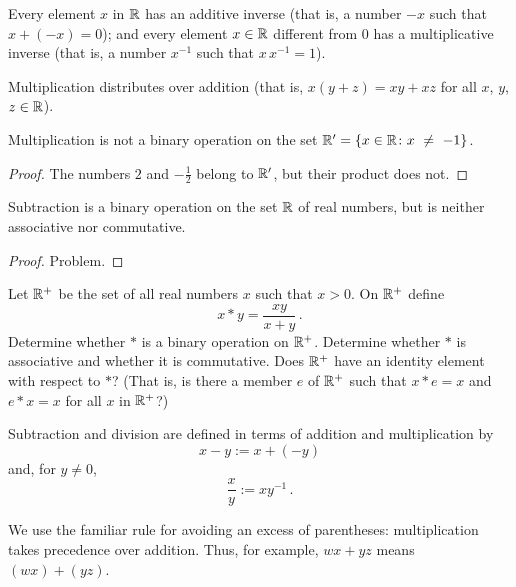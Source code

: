 \begin{ax}[III]  Every element $x$ in $\mathbb{R}$ has an
additive inverse  (that is, a number $- x$ such that $x + (- x) = 0$); and every element $x
\in \mathbb{R}$ different from $0$ has a
multiplicative inverse (that is, a number $x^{-1}$ such that $x\,x^{-1} = 1$).
\end{ax}

\begin{ax}[IV]  Multiplication
%
distributes over addition (that is, $x(y + z)  =  xy + xz$ for all $x$, $y$, $z \in \mathbb{R}$).
\end{ax}

\begin{exam} Multiplication is not a binary operation on the set $\mathbb{R}' = \{x \in \mathbb{R} \colon x~\ne~-1\}$.
\end{exam}

\begin{proof} The numbers $2$ and $-\frac12$ belong to $\mathbb{R}'$, but their product does not.
\end{proof}

\begin{exam} Subtraction is a binary operation on the set $\mathbb{R}$ of real numbers, but is neither
associative nor commutative.
\end{exam}

\begin{proof} Problem. \ns  \end{proof}

\begin{prob} Let $\mathbb{R}^+$ be the set of all real numbers $x$ such that $x > 0$.  On $\mathbb{R}^+$ define
  \[ x \ast y = \frac{xy}{x+y}\,. \]
Determine whether $\ast$ is a binary operation on $\mathbb{R}^+$. Determine whether $\ast$ is
associative and whether it is commutative.  Does $\mathbb{R}^+$ have an identity element with respect
to $\ast$?  (That is, is there a member $e$ of $\mathbb{R}^+$ such that $x \ast e = x$ and $e \ast x =
x$ for all $x$ in $\mathbb{R}^+$?)
\end{prob}

Subtraction  and  division  are defined in terms of addition and multiplication by
  \[ x - y := x + (-y) \]
and, for $y \ne 0$,
  \[ \frac xy := xy^{-1}\,. \]

We use the familiar rule for avoiding an excess of parentheses: multiplication takes
precedence over addition. Thus, for example, $wx + yz$ means $(wx) + (yz)$.


